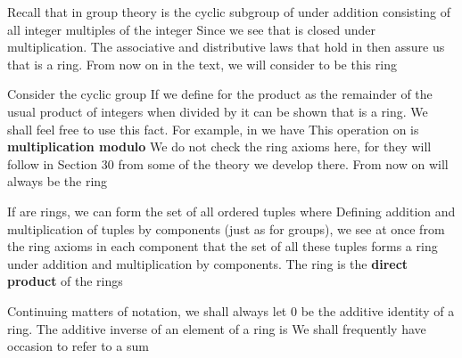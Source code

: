 \documentclass[11pt,oneside]{article}
\begin{document}
\begin{BookBody}

 Recall that in group theory is the cyclic subgroup of  under addition consisting of all integer multiples of the integer  Since  we see that  is closed under multiplication. The associative and distributive laws that hold in  then assure us that  is a ring. From now on in the text, we will consider  to be this ring\BookEnd{\blacktriangle}

 Consider the cyclic group  If we define for  the product  as the remainder of the usual product of integers when divided by  it can be shown that  is a ring. We shall feel free to use this fact. For example, in  we have  This operation on  is\textbf{ multiplication modulo}  We do not check the ring axioms here, for they will follow in Section 30 from some of the theory we develop there. From now on will always be the ring \BookEnd{\blacktriangle}

 If  are rings, we can form the set  of all ordered tuples  where  Defining addition and multiplication of tuples by components (just as for groups), we see at once from the ring axioms in each component that the set of all these tuples forms a ring under addition and multiplication by components. The ring  is the\textbf{ direct product} of the rings \BookEnd{\blacktriangle}

Continuing matters of notation, we shall always let 0 be the additive identity of a ring. The additive inverse of an element  of a ring is  We shall frequently have occasion to refer to a sum


\end{BookBody}
\end{document}
